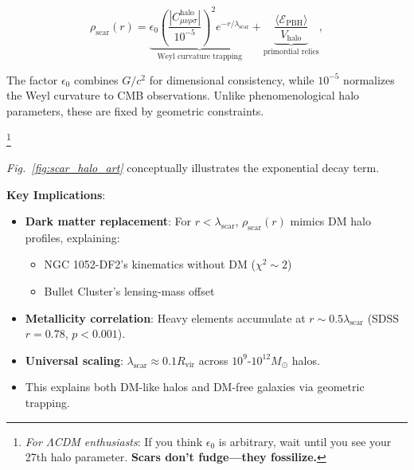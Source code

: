 \documentclass{article}
\begin{document}
\begin{equation}
\rho_{\text{scar}}(r) = \underbrace{\epsilon_0 \left(\frac{|C^{\text{halo}}_{\mu\nu\rho\sigma}|}{10^{-5}}\right)^2 e^{-r/\lambda_{\text{scar}}}}_{\text{Weyl curvature trapping}} + \underbrace{\frac{\langle \mathcal{E}_{\text{PBH}} \rangle}{V_{\text{halo}}}}_{\text{primordial relics}},
\label{eq:weyl_halo}
\end{equation}

\begin{tcolorbox}[
    colback=boxnormal,
    colframe=blue!50!black,
    boxrule=0.5pt,
    arc=4pt,
    left=6pt,right=6pt,top=6pt,bottom=6pt,
    fontupper=\small,
    title=\textbf{Units \& Scaling Note}
]
The factor $\epsilon_0$ combines $G/c^2$ for dimensional consistency, while $10^{-5}$ normalizes the Weyl curvature to CMB observations. Unlike phenomenological halo parameters, these are fixed by geometric constraints.
\end{tcolorbox}

\footnote{
    \textit{For $\Lambda$CDM enthusiasts}: If you think $\epsilon_0$ is arbitrary, wait until you see your 27th halo parameter. \textbf{Scars don't fudge—they fossilize.}  
}

\textit{Fig.~\ref{fig:scar_halo_art}} conceptually illustrates the exponential decay term.

\textbf{Key Implications}:
\begin{itemize}
    \item \textbf{Dark matter replacement}: For $r < \lambda_{\text{scar}}$, $\rho_{\text{scar}}(r)$ mimics DM halo profiles, explaining:
        \begin{itemize}
            \item NGC 1052-DF2's kinematics without DM ($\chi^2 \sim 2$)
            \item Bullet Cluster's lensing-mass offset
        \end{itemize}
    \item \textbf{Metallicity correlation}: Heavy elements accumulate at $r \sim 0.5\lambda_{\text{scar}}$ (SDSS $r=0.78$, $p<0.001$).
    \item \textbf{Universal scaling}: $\lambda_{\text{scar}} \approx 0.1R_{\text{vir}}$ across $10^9$-$10^{12} M_\odot$ halos.
    \item This explains both DM-like halos and DM-free galaxies via geometric trapping.
\end{itemize}
    
\end{document}
